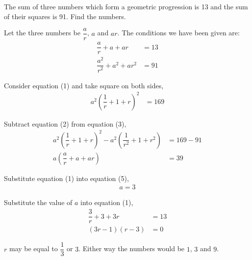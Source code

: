 

\question[3] The sum of three numbers which form a geometric progression is 13 and the sum of their squares is 91. Find the numbers.


\ifprintanswers
\fi 

\begin{solution}[\halfpage]
  Let the three numbers be $\dfrac{a}{r}$, $a$ and $ar$. The conditions we have been given are:
  \begin{align}
    \dfrac{a}{r} + a + ar                       &= 13 \\
    \dfrac{a^2}{r^2} + a^2 + {ar}^2 &= 91
  \end{align}

  Consider equation (1) and take square on both sides,
  \begin{align}
    a^2(\dfrac{1}{r} + 1 + r)^2 &= 169
  \end{align}
  
  Subtract equation (2) from equation (3),
  \begin{align}
    a^2(\dfrac{1}{r} + 1 + r)^2 - a^2(\dfrac{1}{r^2} + 1 + r^2) &= 169 - 91 \\
                                                                 a(\dfrac{a}{r} + a + ar) &= 39
  \end{align}
  
  Substitute equation (1) into equation (5),
  \begin{align}
    a = 3
  \end{align}  
  
  Substitute the value of $a$ into equation (1),
  \begin{align}
    \dfrac{3}{r} + 3 + 3r &= 13 \\
    (3r - 1)(r - 3)                &= 0
  \end{align}  
  
  $r$ may be equal to $\dfrac{1}{3}$ or $3$. Either way the numbers would be $1$, $3$ and $9$.
  
\end{solution}

